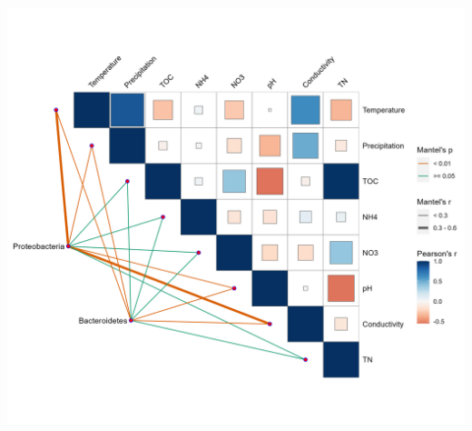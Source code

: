 \documentclass[
]{book}
\begin{document}
\begin{center}\includegraphics[width=650px]{Images/plot_env_mantel_ggcor} \end{center}

  
\end{document}
